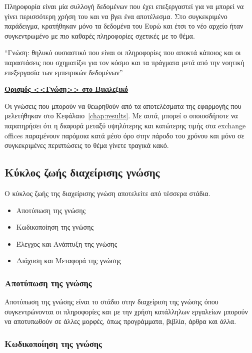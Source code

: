 Πληροφορία είναι μία συλλογή δεδομένων που έχει επεξεργαστεί για να μπορεί να γίνει περισσότερη χρήση του και να βγει ένα αποτέλεσμα. Στο συγκεκριμένο παράδειγμα, κρατήθηκαν μόνο τα δεδομένα του Ευρώ και έτσι το νέο αρχείο ήταν συγκεντρωμένο με πιο καθαρές πληροφορίες σχετικές με το θέμα.

\begin{problem}
  ``Γνώση: θηλυκό ουσιαστικό που είναι οι πληροφορίες που αποκτά κάποιος και οι παραστάσεις που σχηματίζει για τον κόσμο και τα πράγματα μετά από την νοητική επεξεργασία των εμπειρικών δεδομένων''

  \href{https://el.wiktionary.org/wiki/%CE%B3%CE%BD%CF%8E%CF%83%CE%B7}{\textbf{Ορισμός <<Γνώση>> στο Βικιλεξικό}}
\end{problem}

Οι γνώσεις που μπορούν να θεωρηθούν από τα αποτελέσματα της εφαρμογής που μελετήθηκαν στο Κεφάλαιο~\ref{chap:results}. Με αυτά, μπορεί ο οποιοσδήποτε να παρατηρήσει ότι η διαφορά μεταξύ υψηλότερης και κατώτερης τιμής στα exchange offices παραμένουν παρόμοια κατά μέσο όρο στην πάροδο του χρόνου και μόνο σε συγκεκριμένες περιπτώσεις το θέμα γίνετε τραγικά κακό.

\subsection{Κύκλος ζωής διαχείρισης γνώσης}

Ο κύκλος ζωής της διαχείρισης γνώση αποτελείτε από τέσσερα στάδια.

\begin{itemize}
  \item Αποτύπωση της γνώσης
  \item Κωδικοποίηση της γνώσης
  \item Έλεγχος και Ανάπτυξη της γνώσης
  \item Διάχυση και Μεταφορά της γνώσης
\end{itemize}

\subsubsection{Αποτύπωση της γνώσης}

Αποτύπωση της γνώσης είναι το στάδιο στην διαχείριση της γνώσης όπου συγκεντρώνονται οι πληροφορίες και με την χρήση κατάλληλων εργαλείων μπορούν να αποτυπωθούν σε άλλες μορφές, όπως προγράμματα, βιβλία, άρθρα και άλλα.

\subsubsection{Κωδικοποίηση της γνώσης}

